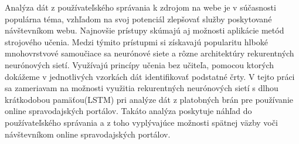Analýza dát z používateľského správania k zdrojom na webe je v súčasnosti populárna téma, vzhľadom na svoj potenciál zlepšovať služby poskytované návštevníkom webu. Najnovšie prístupy skúmajú aj možnosti aplikácie metód strojového učenia. 
Medzi týmito prístupmi si získavajú popularitu hlboké mnohovrstvové samoučiace sa neurónové siete a rôzne architektúry rekurentných neurónových sietí. Využívajú princípy učenia bez učiteľa, pomocou ktorých dokážeme v jednotlivých vzorkách dát identifikovať podstatné črty. V tejto práci sa zameriavam na možnosti využitia rekurentných neurónových sietí s dlhou krátkodobou pamäťou(LSTM) pri analýze dát z platobných brán pre používanie online spravodajských portálov. Takáto analýza poskytuje náhľad do používateľského správania a z toho vyplývajúce možnosti spätnej väzby voči návštevníkom online spravodajských portálov.  

